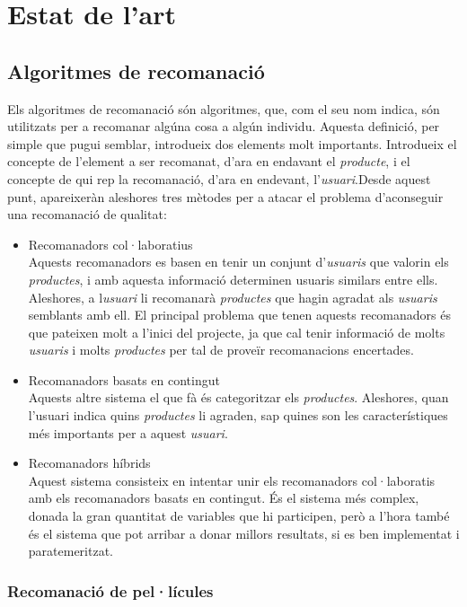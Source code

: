 \chapter{Estat de l'art}

\section{Algoritmes de recomanació}

Els algoritmes de recomanació són algoritmes, que, com el seu nom indica, són utilitzats per a recomanar algúna cosa a algún individu. Aquesta definició, per simple que pugui semblar, introdueix dos elements molt importants. Introdueix el concepte de l'element a ser recomanat, d'ara en endavant el \emph{producte}, i el concepte de qui rep la recomanació, d'ara en endevant, l'\emph{usuari}.Desde aquest punt, apareixeràn aleshores tres mètodes per a atacar el problema d'aconseguir una recomanació de qualitat:

\begin{itemize}
	\item Recomanadors col·laboratius \\
		Aquests recomanadors es basen en tenir un conjunt d'\emph{usuaris} que valorin els \emph{productes}, i amb aquesta informació determinen usuaris similars entre ells. Aleshores, a l\emph{usuari} li recomanarà \emph{productes} que hagin agradat als \emph{usuaris} semblants amb ell. El principal problema que tenen aquests recomanadors és que pateixen molt a l'inici del projecte, ja que cal tenir informació de molts \emph{usuaris} i molts \emph{productes} per tal de proveïr recomanacions encertades.
	\item Recomanadors basats en contingut \\
		Aquests altre sistema el que fà és categoritzar els \emph{productes}. Aleshores, quan l'usuari indica quins \emph{productes} li agraden, sap quines son les característiques més importants per a aquest \emph{usuari}.
	\item Recomanadors híbrids \\
		Aquest sistema consisteix en intentar unir els recomanadors col·laboratis amb els recomanadors basats en contingut. És el sistema més complex, donada la gran quantitat de variables que hi participen, però a l'hora també és el sistema que pot arribar a donar millors resultats, si es ben implementat i paratemeritzat.
\end{itemize}

\subsection{Recomanació de pel·lícules}

